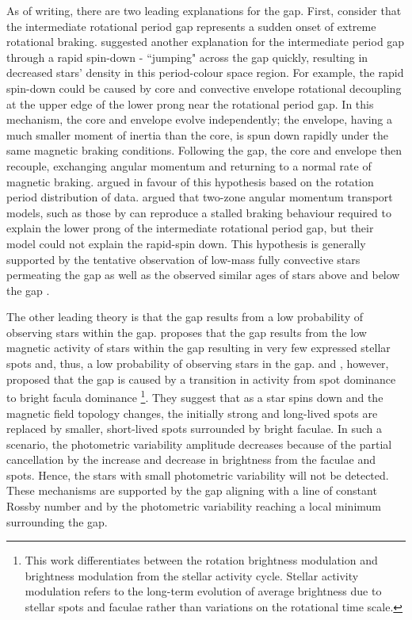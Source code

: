 As of writing, there are two leading explanations for the gap.
First, consider that the intermediate rotational period gap represents a sudden onset of extreme rotational braking.
\citet{mcquillan_rotation_2014} suggested another explanation for the intermediate period gap through a rapid spin-down - ``jumping" across the gap quickly, resulting in decreased stars' density in this period-colour space region.
For example, the rapid spin-down could be caused by core and convective envelope rotational decoupling at the upper edge of the lower prong near the rotational period gap.
In this mechanism, the core and envelope evolve independently; the envelope, having a much smaller moment of inertia than the core, is spun down rapidly under the same magnetic braking conditions.
Following the gap, the core and envelope then recouple, exchanging angular momentum and returning to a normal rate of magnetic braking. 
\citet{gordon_stellar_2021} argued in favour of this hypothesis based on the rotation period distribution of \ktoo{} data. 
\citet{curtis_when_2020} argued that two-zone angular momentum transport models, such as those by \citet{spada_competing_2020} can reproduce a stalled braking behaviour required to explain the lower prong of the intermediate rotational period gap, but their model could not explain the rapid-spin down.
This hypothesis is generally supported by the tentative observation of low-mass fully convective stars permeating the gap as well as the observed similar ages of stars above and below the gap \citep{lu_bridging_2022}.

The other leading theory is that the gap results from a low probability of observing stars within the gap.
\citet{chahal_statistics_2022} proposes that the gap results from the low magnetic activity of stars within the gap resulting in very few expressed stellar spots and, thus, a low probability of observing stars in the gap.
\citet{reinhold_transition_2019} and \citet{reinhold_stellar_2020}, however, proposed that the gap is caused by a transition in activity from spot dominance to bright facula dominance \footnote{This work differentiates between the rotation brightness modulation and brightness modulation from the stellar activity cycle. Stellar activity modulation refers to the long-term evolution of average brightness due to stellar spots and faculae rather than variations on the rotational time scale.}.
They suggest that as a star spins down and the magnetic field topology changes, the initially strong and long-lived spots are replaced by smaller, short-lived spots surrounded by bright faculae.
In such a scenario, the photometric variability amplitude decreases because of the partial cancellation by the increase and decrease in brightness from the faculae and spots.
Hence, the stars with small photometric variability will not be detected.
These mechanisms are supported by the gap aligning with a line of constant Rossby number and by the photometric variability reaching a local minimum surrounding the gap.


